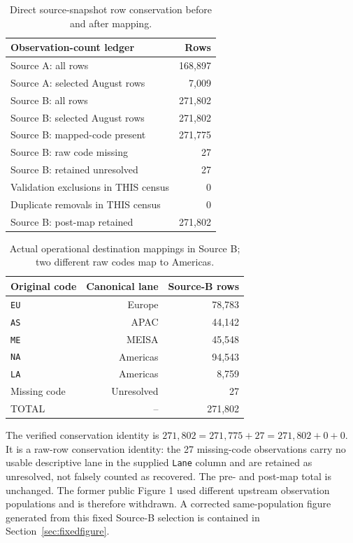 \documentclass[11pt]{article}
\begin{document}
\begin{table}[htbp]\centering\scriptsize
\caption{Direct source-snapshot row conservation before and after mapping.}\label{tab:verified-count}
\begin{tabular}{lr}\toprule
Observation-count ledger & Rows \\
\midrule
Source A: all rows & 168,897 \\
Source A: selected August rows & 7,009 \\
Source B: all rows & 271,802 \\
Source B: selected August rows & 271,802 \\
Source B: mapped-code present & 271,775 \\
Source B: raw code missing & 27 \\
Source B: retained unresolved & 27 \\
Validation exclusions in THIS census & 0 \\
Duplicate removals in THIS census & 0 \\
Source B: post-map retained & 271,802 \\
\bottomrule\end{tabular}\end{table}

\begin{table}[htbp]\centering\scriptsize
\caption{Actual operational destination mappings in Source B; two different raw codes map to Americas.}\label{tab:verified-codemap}
\begin{tabular}{lrr}\toprule
Original code & Canonical lane & Source-B rows \\
\midrule
\texttt{EU} & Europe & 78,783 \\
\texttt{AS} & APAC & 44,142 \\
\texttt{ME} & MEISA & 45,548 \\
\texttt{NA} & Americas & 94,543 \\
\texttt{LA} & Americas & 8,759 \\
Missing code & Unresolved & 27 \\
TOTAL & -- & 271,802 \\
\bottomrule\end{tabular}\end{table}

The verified conservation identity is $271{,}802=271{,}775+27=271{,}802+0+0$. It is a raw-row conservation identity: the 27 missing-code observations carry no usable descriptive lane in the supplied \texttt{Lane} column and are retained as unresolved, not falsely counted as recovered. The pre- and post-map total is unchanged. The former public Figure 1 used different upstream observation populations and is therefore withdrawn. A corrected same-population figure generated from this fixed Source-B selection is contained in Section~\ref{sec:fixedfigure}.
\end{document}
